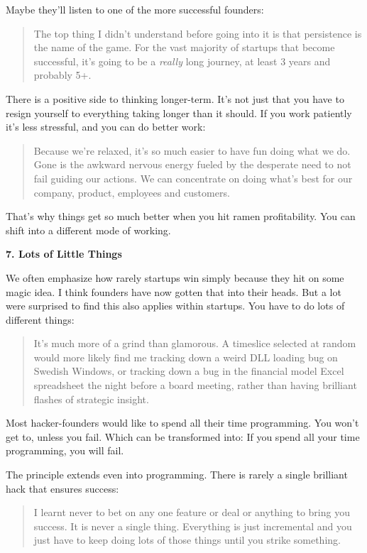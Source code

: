 Maybe they'll listen to one of the more successful founders:

\begin{quote}
The top thing I didn't understand before going into it is that
persistence is the name of the game. For the vast majority of startups
that become successful, it's going to be a \emph{really} long journey,
at least 3 years and probably 5+.
\end{quote}

There is a positive side to thinking longer-term. It's not just that you
have to resign yourself to everything taking longer than it should. If
you work patiently it's less stressful, and you can do better work:

\begin{quote}
Because we're relaxed, it's so much easier to have fun doing what we do.
Gone is the awkward nervous energy fueled by the desperate need to not
fail guiding our actions. We can concentrate on doing what's best for
our company, product, employees and customers.
\end{quote}

That's why things get so much better when you hit ramen profitability.
You can shift into a different mode of working.

\textbf{7. Lots of Little Things}

We often emphasize how rarely startups win simply because they hit on
some magic idea. I think founders have now gotten that into their heads.
But a lot were surprised to find this also applies within startups. You
have to do lots of different things:

\begin{quote}
It's much more of a grind than glamorous. A timeslice selected at random
would more likely find me tracking down a weird DLL loading bug on
Swedish Windows, or tracking down a bug in the financial model Excel
spreadsheet the night before a board meeting, rather than having
brilliant flashes of strategic insight.
\end{quote}

Most hacker-founders would like to spend all their time programming. You
won't get to, unless you fail. Which can be transformed into: If you
spend all your time programming, you will fail.

The principle extends even into programming. There is rarely a single
brilliant hack that ensures success:

\begin{quote}
I learnt never to bet on any one feature or deal or anything to bring
you success. It is never a single thing. Everything is just incremental
and you just have to keep doing lots of those things until you strike
something.
\end{quote}

